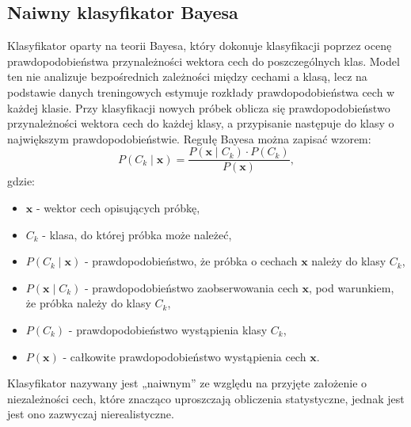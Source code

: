 \documentclass[a4paper,twoside,12pt]{book}
\begin{document}
\subsection*{Naiwny klasyfikator Bayesa}
Klasyfikator oparty na teorii Bayesa, który dokonuje klasyfikacji poprzez ocenę prawdopodobieństwa przynależności wektora cech do poszczególnych klas. Model ten nie analizuje bezpośrednich zależności między cechami a klasą, lecz na podstawie danych treningowych estymuje rozkłady prawdopodobieństwa cech w każdej klasie. Przy klasyfikacji nowych próbek oblicza się prawdopodobieństwo przynależności wektora cech do każdej klasy, a przypisanie następuje do klasy o największym prawdopodobieństwie. Regułę Bayesa można zapisać wzorem:
\begin{equation}
	P(C_k \mid \mathbf{x}) = \frac{P(\mathbf{x} \mid C_k) \cdot P(C_k)}{P(\mathbf{x})},
\end{equation}
gdzie:
\begin{itemize}
	\item $\mathbf{x}$ - wektor cech opisujących próbkę,
	\item $C_k$ - klasa, do której próbka może należeć,
	\item $P(C_k \mid \mathbf{x})$ - prawdopodobieństwo, że próbka o cechach $\mathbf{x}$ należy do klasy $C_k$,
	\item $P(\mathbf{x} \mid C_k)$ - prawdopodobieństwo zaobserwowania cech $\mathbf{x}$, pod warunkiem, że próbka należy do klasy $C_k$,
	\item $P(C_k)$ - prawdopodobieństwo wystąpienia klasy $C_k$,
	\item $P(\mathbf{x})$ - całkowite prawdopodobieństwo wystąpienia cech $\mathbf{x}$.
\end{itemize}

Klasyfikator nazywany jest „naiwnym” ze względu na przyjęte założenie o niezależności cech, które znacząco uproszczają obliczenia statystyczne, jednak jest jest ono zazwyczaj nierealistyczne.

\end{document}
